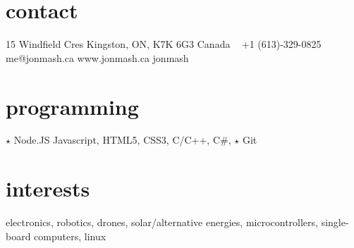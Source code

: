 
\begin{aside}
%
\section{contact}
15 Windfield Cres
Kingston, ON, K7K 6G3
Canada
~
+1 (613)-329-0825
~
me@jonmash.ca \faEnvelope
www.jonmash.ca \faLink
jonmash \faGithub
%
\section{programming}
{\color{orange} $\star$} Node.JS
Javascript, HTML5, CSS3, C/C++, C\#, 
{\color{orange} $\star$} Git
%
\section{interests}
electronics, robotics, drones, solar/alternative energies, microcontrollers, single-board computers, linux
%
\end{aside}